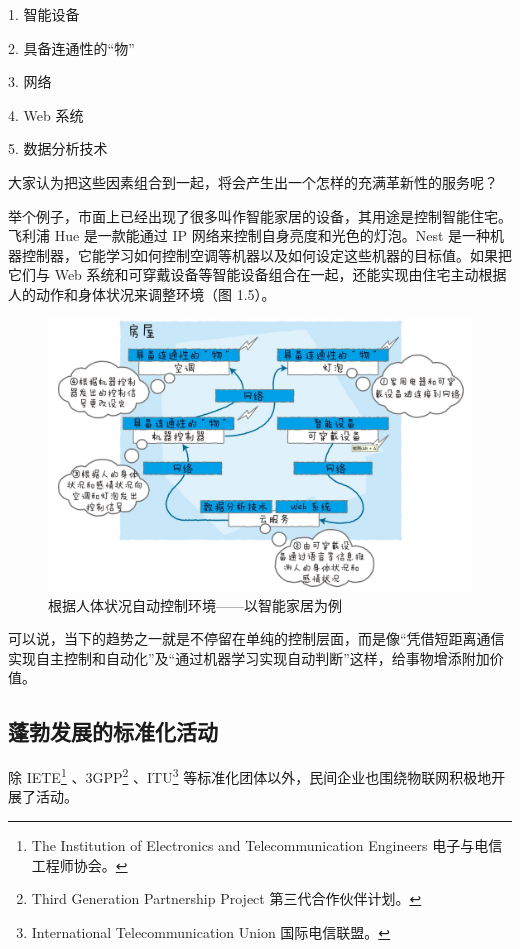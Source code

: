 \documentclass[12pt,UTF8]{ctexbook}
\begin{document}
1. 智能设备

2. 具备连通性的“物”

3. 网络

4. Web 系统

5. 数据分析技术

大家认为把这些因素组合到一起，将会产生出一个怎样的充满革新性的服务呢？

举个例子，市面上已经出现了很多叫作智能家居的设备，其用途是控制智能住宅。飞利浦 Hue 是一款能通过 IP 网络来控制自身亮度和光色的灯泡。Nest 是一种机器控制器，它能学习如何控制空调等机器以及如何设定这些机器的目标值。如果把它们与 Web 系统和可穿戴设备等智能设备组合在一起，还能实现由住宅主动根据人的动作和身体状况来调整环境（图 1.5）。

\begin{figure}[htbp]
	\centering
	\includegraphics[width=1\linewidth]{5}
	\caption{根据人体状况自动控制环境——以智能家居为例}
	\label{fig:1}
\end{figure}

可以说，当下的趋势之一就是不停留在单纯的控制层面，而是像“凭借短距离通信实现自主控制和自动化”及“通过机器学习实现自动判断”这样，给事物增添附加价值。

\subsection{蓬勃发展的标准化活动}

除 IETE\footnote{The Institution of Electronics and Telecommunication Engineers
电子与电信工程师协会。} 、3GPP\footnote{Third Generation Partnership Project
第三代合作伙伴计划。} 、ITU\footnote{International Telecommunication Union
国际电信联盟。} 等标准化团体以外，民间企业也围绕物联网积极地开展了活动。
\end{document}

